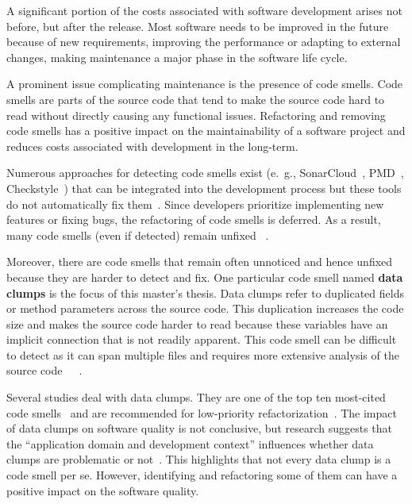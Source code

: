 \label{sec:introduction}

A significant portion of the costs associated with software development arises not before, but after the release. Most software needs to be improved in the future because of new requirements, improving the performance or adapting to external changes, making maintenance a major phase in the  software life cycle.~\cite{465272}


A prominent issue  complicating maintenance is the presence of code smells. Code smells are parts of the source code that tend to make the source code hard to read without directly causing any functional issues. Refactoring and removing code smells has a positive impact on the maintainability  of a software project and reduces costs associated with development in the long-term.~\cite{mealyEvaluatingSoftwareRefactoring2006}



Numerous approaches for detecting code smells exist (e.~g., SonarCloud~\cite{sonarcloud},  PMD~\cite{pmd}, Checkstyle~\cite{checkstyle}) that can be integrated into the development process but these tools do not automatically fix them~\cite{vidalApproachPrioritizeCode2016}. Since developers prioritize implementing new features or fixing bugs, the refactoring of code smells is deferred. As a result, many code smells (even if detected) remain unfixed  ~\cite{10.1145/2393596.2393655}.

Moreover, there are code smells that remain often unnoticed and hence unfixed because they are harder to detect and fix. One particular code smell named \textbf{data clumps} is the focus of this master's thesis. Data clumps refer to duplicated fields or method parameters across the source code. This duplication increases the code size and makes the source code harder to read because these variables have an implicit connection that is not readily apparent.  This code smell can be difficult to detect as it can span multiple files and requires more extensive analysis of the source code~\cite{BaumgartnerAP23}~\cite{data_clumps_refactoring_guru}~\cite{join_data_items}.
 
Several studies deal with data clumps. They are one of the top ten most-cited code smells~\cite{lacerda} and are recommended for low-priority refactorization~\cite{zhangPrioritisingRefactoringUsing2011}. The impact of data clumps on software quality is not conclusive, but research suggests that the \enquote{application domain and development context} influences whether data clumps are problematic or not~\cite{hallCodeSmellsHave2014}. This highlights that not every data clump is a code smell per se. However,  identifying and refactoring some of them can have a positive impact on the software quality. 

